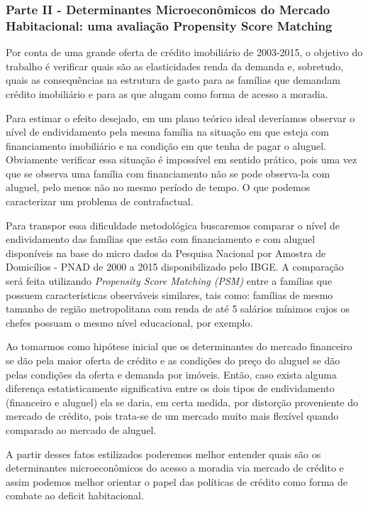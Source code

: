 \subsubsection*{Parte II - Determinantes Microeconômicos do Mercado Habitacional: uma avaliação Propensity Score Matching}

Por conta de uma grande oferta de crédito imobiliário de 2003-2015, o objetivo do trabalho é verificar quais são as elasticidades renda da demanda e, sobretudo, quais as consequências na estrutura de gasto para as famílias que demandam crédito imobiliário e para as que alugam como forma de acesso a moradia.

Para estimar o efeito desejado, em um plano teórico ideal deveríamos observar o nível de endividamento pela mesma família na situação em que esteja com financiamento imobiliário e na condição em que tenha de pagar o aluguel. Obviamente verificar essa situação é impossível em sentido prático, pois uma vez que se observa uma família com financiamento não se pode observa-la com aluguel, pelo menos não no mesmo período de tempo. O que podemos caracterizar um problema de contrafactual.

Para transpor essa dificuldade metodológica buscaremos comparar o nível de endividamento das famílias que estão com financiamento e com aluguel disponíveis na base do micro dados da Pesquisa Nacional por Amostra de Domicílios - PNAD de 2000 a 2015 disponibilizado pelo IBGE. A comparação será feita utilizando \textit{Propensity Score Matching (PSM)} entre a famílias que possuem características observáveis similares, tais como: famílias de mesmo tamanho de região metropolitana com renda de até 5 salários mínimos cujos os chefes possuam o mesmo nível educacional, por exemplo.

Ao tomarmos como hipótese inicial que os determinantes do mercado financeiro se dão pela maior oferta de crédito e as condições do preço do aluguel se dão pelas condições da oferta e demanda por imóveis. Então, caso exista alguma diferença estatisticamente significativa entre os dois tipos de endividamento (financeiro e aluguel) ela se daria, em certa medida, por distorção proveniente do mercado de crédito, pois trata-se de um mercado muito mais flexível quando comparado ao mercado de aluguel.


A partir desses fatos estilizados poderemos melhor entender quais são os determinantes microeconômicos do acesso a moradia via mercado de crédito e assim podemos melhor orientar o papel das políticas de crédito como forma de combate ao deficit habitacional.

